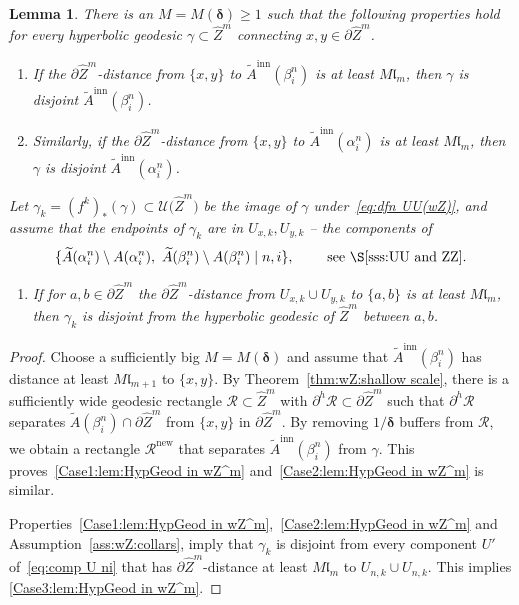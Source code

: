 \documentclass{amsart}
\renewcommand{\sp}{{\ \ }}
\newcommand{\1}{{\mathbb 1 }}
\newcommand\RR{\mathcal{R}}
\newcommand{\wZ}{{\widehat Z}}
\newcommand{\length}{{\mathfrak l}}
\newcommand\inn{{\operatorname{inn}}}
\newcommand\UU{\mathcal{U}}
\newcommand\new{{\operatorname{new}}}
\newtheorem{lem}[thm]{Lemma}
\theoremstyle{remark}
\numberwithin{equation}{section}
\theoremstyle{definition}
\newcommand{\bdelta}{{\boldsymbol{ \delta}}}
\begin{document}
\begin{lem}
\label{lem:HypGeod in wZ^m}
There is an $M=M(\bdelta)\ge 1$ such that the following properties hold for every hyperbolic geodesic $\gamma\subset \wZ^m$ connecting $x,y\in \partial \wZ^m$.
\begin{enumerate}[label=\text{(\Roman*)},font=\normalfont,leftmargin=*]
\item \label{Case1:lem:HypGeod in wZ^m} If the $\partial \wZ^m$-distance from $\{x,y\}$ to $\widetilde A^\inn(\beta^n_i)$ is at least $M\length_{m}$, then $\gamma$ is disjoint $\widetilde A^\inn(\beta^n_i)$.

\item\label{Case2:lem:HypGeod in wZ^m} Similarly, if the $\partial \wZ^m$-distance from $\{x,y\}$ to $\widetilde A^\inn(\alpha^n_i)$ is at least $M\length_{m}$, then $\gamma$ is disjoint $\widetilde A^\inn(\alpha^n_i)$.
\end{enumerate}

\noindent Let $\gamma_k=(f^k)_*(\gamma)\subset \UU\big(\wZ^m\big)$ be the image of $\gamma$ under~\eqref{eq:dfn UU(wZ)}, and assume that the endpoints of $\gamma_k$ are in $U_{x,k}, U_{y,k}$ -- the components of 
\begin{equation}
\label{eq:comp U ni}
\{\widetilde A(\alpha^n_i)\setminus A(\alpha^n_i), \ \widetilde A(\beta^n_i)\setminus A(\beta^n_i)\mid n,i\},\sp\sp\sp\text{ see~\S\ref{sss:UU and ZZ}} .
\end{equation}

\begin{enumerate}[label=\text{(\Roman*)},start=3,font=\normalfont,leftmargin=*]
\item \label{Case3:lem:HypGeod in wZ^m}  If for $a,b\in \partial \wZ^m$ the  $\partial \wZ^m$-distance from $U_{x,k}\cup U_{y,k}$ to $\{a,b\}$ is at least $M\length_{m}$, then $\gamma_k$ is disjoint from the hyperbolic geodesic of $\wZ^m$ between $a,b$.
\end{enumerate}
\end{lem}
\begin{proof}
Choose a sufficiently big $M=M(\bdelta)$ and assume that $\widetilde A^\inn (\beta^n_i)$ has distance at least $M\length_{m+1}$ to $\{x,y\}$. By Theorem~\ref{thm:wZ:shallow scale}, there is a sufficiently wide geodesic rectangle $\RR\subset\wZ^m$ with $\partial^h \RR\subset \partial \wZ^m$ such that $\partial^h \RR$ separates $\widetilde A (\beta^n_i)\cap \partial \wZ^m$ from $\{x,y\}$ in $\partial \wZ^m$. By removing $1/\bdelta$ buffers from $\RR$, we obtain a rectangle $\RR^\new$ that separates $\widetilde A^\inn (\beta^n_i)$ from $\gamma$. This proves~\ref{Case1:lem:HypGeod in wZ^m} and~\ref{Case2:lem:HypGeod in wZ^m} is similar.

Properties~\ref{Case1:lem:HypGeod in wZ^m},~\ref{Case2:lem:HypGeod in wZ^m} and Assumption~\ref{ass:wZ:collars}, imply that $\gamma_k$ is disjoint from every component $U'$ of~\eqref{eq:comp U ni} that has $\partial \wZ^m$-distance at least $M\length_{m}$ to $U_{n,k}\cup U_{n,k}$. This implies \ref{Case3:lem:HypGeod in wZ^m}.
\end{proof}
\end{document}
